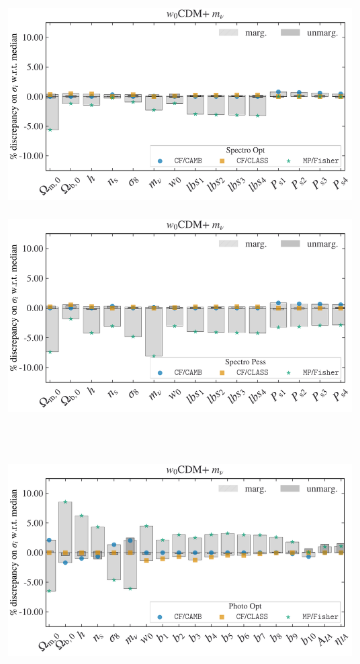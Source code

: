 \documentclass[oneside]{book}
\begin{document}
\begin{figure}
    \centering
    \caption{Same as figure \ref{fig:Comparison_w0wa} but for the $w_0$CDM+$m_\nu$ model}
    \begin{subfigure}[b]{0.49\textwidth}
        \centering
        \includegraphics[width=\textwidth]{Spectro_Opt_mnu+w0_error_comparison.pdf}
    \end{subfigure}
    \hfill
    \begin{subfigure}[b]{0.49\textwidth}
        \centering
        \includegraphics[width=\textwidth]{Spectro_Pess_mnu+w0_error_comparison.pdf}
    \end{subfigure}\\
    \begin{subfigure}[b]{0.49\textwidth}
        \centering
        \includegraphics[width=\textwidth]{Photo_Opt_mnu+w0_error_comparison.pdf}

\end{subfigure}
\end{figure}
\end{document}
